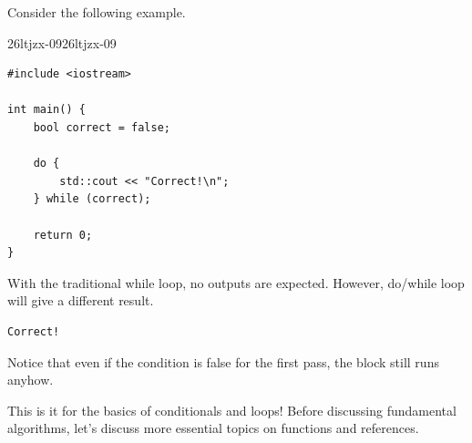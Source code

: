 \documentclass[../../../main.tex]{subfiles}
\begin{document}
Consider the following example.

\begin{cppbox}{26ltjzx-09}{26ltjzx-09}
\begin{lstlisting}[style=cppstyle]
#include <iostream>

int main() {
    bool correct = false;

    do {
        std::cout << "Correct!\n";
    } while (correct);

    return 0;
}
\end{lstlisting}
\end{cppbox}

With the traditional while loop, no outputs are expected. However,
do/while loop will give a different result.

\begin{outputbox}
\begin{lstlisting}[style=basic]
Correct!
\end{lstlisting}
\end{outputbox}

Notice that even if the condition is false for the first pass,
the block still runs anyhow.

This is it for the basics of conditionals and loops! Before discussing
fundamental algorithms, let's discuss more essential topics on
functions and references.
\end{document}
